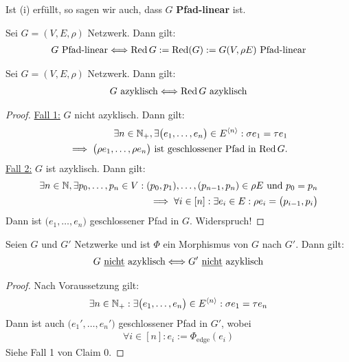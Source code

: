 \begin{bemerkung}
	Ist (i) erfüllt, so sagen wir auch, dass $G$ \textbf{Pfad-linear} ist.
\end{bemerkung}

\begin{proposition}[Claim 1]
	Sei $G=(V,E,\rho)$ Netzwerk. Dann gilt:
	\begin{align*}
		G\text{ Pfad-linear}\Longleftrightarrow\operatorname{Red} G:=\operatorname{Red}(G):=G(V,\rho E)\text{ Pfad-linear}
	\end{align*}
\end{proposition}

\begin{proposition}[Claim 0]
	Sei $G=(V,E,\rho)$ Netzwerk. Dann gilt:
	\begin{align*}
		G\text{ azyklisch}\Longleftrightarrow\operatorname{Red} G\text{ azyklisch}
	\end{align*}
\end{proposition}

\begin{proof}
	\underline{Fall 1:} $G$ nicht azyklisch. Dann gilt:
	\begin{align*}
		\exists n\in\mathbb{N}_+,\exists\big(e_1,\ldots,e_n\big)\in E^{\langle n\rangle}:\sigma e_1=\tau e_1\\
		\implies\big(\rho e_1,\ldots,\rho e_n\big)\text{ ist geschlossener Pfad in $\operatorname{Red} G$}.
	\end{align*}
	\underline{Fall 2:} $G$ ist azyklisch. Dann gilt:
	\begin{align*}
		\exists n\in\mathbb{N},\exists p_0,\ldots,p_n\in V:
		(p_0,p_1),\ldots,(p_{n-1},p_n)\in\rho E\text{ und }p_0=p_n\\
		\implies\forall i\in[n]:\exists e_i\in E:\rho e_i=\big(p_{i-1},p_i\big)
	\end{align*}
	Dann ist $\big(e_1,\ldots,e_n\big)$ geschlossener Pfad in $G$. Widerspruch!
\end{proof}

\begin{proposition}[Claim 2]
	Seien $G$ und $G'$ Netzwerke und ist $\Phi$ ein Morphismus von $G$ nach $G'$. Dann gilt:
	\begin{align*}
		G\text{ \underline{nicht} azyklisch}\Longleftrightarrow G'\text{ \underline{nicht} azyklisch}
	\end{align*}
\end{proposition}

\begin{proof}
	Nach Voraussetzung gilt:
	\begin{align*}
		\exists n\in\mathbb{N}_+:\exists\big(e_1,\ldots,e_n\big)\in E^{\langle n\rangle}:\sigma e_1=\tau e_n
	\end{align*}
	Dann ist auch $\big(e_1',\ldots,e_n'\big)$ geschlossener Pfad in $G'$, wobei
	\begin{align*}
		\forall i\in[n]:e_i:=\Phi_{\text{edge}}(e_i)
	\end{align*}
	Siehe Fall 1 von Claim 0.
\end{proof}

